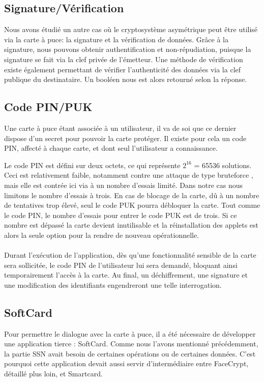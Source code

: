 \documentclass[a4paper,11pt,french]{article}
\begin{document}
\subsection{Signature/Vérification}
Nous avons étudié un autre cas où le cryptosystème asymétrique peut être utilisé
via la carte à puce: la signature et la vérification de données. Grâce à la 
signature, nous pouvons obtenir authentification et non-répudiation, puisque la
signature se fait via la clef privée de l'émetteur. Une méthode de vérification
existe également permettant de vérifier l'authenticité des données via la clef 
publique du destinataire. Un booléen nous est alors retourné selon la réponse.

\label{CodePIN}
\subsection{Code PIN/PUK}
Une carte à puce étant associée à un utilisateur, il va de soi que ce dernier 
dispose d'un secret pour pouvoir la carte protéger. Il existe pour cela un code 
PIN, affecté à chaque carte, et dont seul l'utilisateur a connaissance.

Le code PIN est défini sur deux octets, ce qui représente $2^{16}$ = 65536 solutions.
Ceci est relativement faible, notamment contre une attaque de type 
\og{}bruteforce \fg{}, mais elle est contrée ici via à un nombre d'essais limité.
Dans notre cas nous limitons le nombre d'essais à trois. En cas de blocage de la
carte, dû à un nombre de tentatives trop élevé, seul le code PUK pourra 
débloquer la carte. Tout comme le code PIN, le nombre d'essais pour entrer le 
code PUK est de trois. Si ce nombre est dépassé la carte devient inutilisable et
la réinstallation des applets est alors la seule option pour la rendre
de nouveau opérationnelle.

\paragraph{}
Durant l'exécution de l'application, dès qu'une fonctionnalité sensible de la 
carte sera sollicitée, le code PIN de l'utilisateur lui sera demandé, bloquant 
ainsi temporairement l'accès à la carte. Au final, un déchiffrement, une signature
et une modification des identifiants engendreront une telle interrogation.

\subsection{SoftCard}
Pour permettre le dialogue avec la carte à puce, il a été nécessaire de développer
une application tierce : SoftCard. Comme nous l'avons mentionné précédemment,
la partie SSN avait besoin de certaines opérations ou de certaines données. 
C'est pourquoi cette application devait aussi servir d'intermédiaire entre 
FaceCrypt, détaillé plus loin, et Smartcard.
\end{document}
